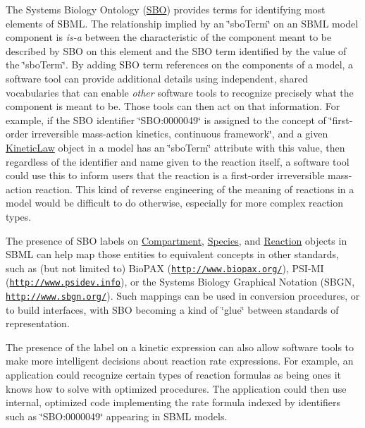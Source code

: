 The Systems Biology Ontology (\hyperlink{class_s_b_o}{S\+BO}) provides terms for identifying most elements of S\+B\+ML. The relationship implied by an \char`\"{}sbo\+Term\char`\"{} on an S\+B\+ML model component is {\itshape is-\/a} between the characteristic of the component meant to be described by S\+BO on this element and the S\+BO term identified by the value of the \char`\"{}sbo\+Term\char`\"{}. By adding S\+BO term references on the components of a model, a software tool can provide additional details using independent, shared vocabularies that can enable {\itshape other} software tools to recognize precisely what the component is meant to be. Those tools can then act on that information. For example, if the S\+BO identifier {\ttfamily \char`\"{}\+S\+B\+O\+:0000049\char`\"{}} is assigned to the concept of \char`\"{}first-\/order irreversible mass-\/action kinetics,
continuous framework\char`\"{}, and a given \hyperlink{class_kinetic_law}{Kinetic\+Law} object in a model has an \char`\"{}sbo\+Term\char`\"{} attribute with this value, then regardless of the identifier and name given to the reaction itself, a software tool could use this to inform users that the reaction is a first-\/order irreversible mass-\/action reaction. This kind of reverse engineering of the meaning of reactions in a model would be difficult to do otherwise, especially for more complex reaction types.

The presence of S\+BO labels on \hyperlink{class_compartment}{Compartment}, \hyperlink{class_species}{Species}, and \hyperlink{class_reaction}{Reaction} objects in S\+B\+ML can help map those entities to equivalent concepts in other standards, such as (but not limited to) Bio\+P\+AX (\href{http://www.biopax.org/}{\tt http\+://www.\+biopax.\+org/}), P\+S\+I-\/\+MI (\href{http://www.psidev.info/index.php?q=node/60}{\tt http\+://www.\+psidev.\+info}), or the Systems Biology Graphical Notation (S\+B\+GN, \href{http://www.sbgn.org/}{\tt http\+://www.\+sbgn.\+org/}). Such mappings can be used in conversion procedures, or to build interfaces, with S\+BO becoming a kind of \char`\"{}glue\char`\"{} between standards of representation.

The presence of the label on a kinetic expression can also allow software tools to make more intelligent decisions about reaction rate expressions. For example, an application could recognize certain types of reaction formulas as being ones it knows how to solve with optimized procedures. The application could then use internal, optimized code implementing the rate formula indexed by identifiers such as {\ttfamily \char`\"{}\+S\+B\+O\+:0000049\char`\"{}} appearing in S\+B\+ML models.

